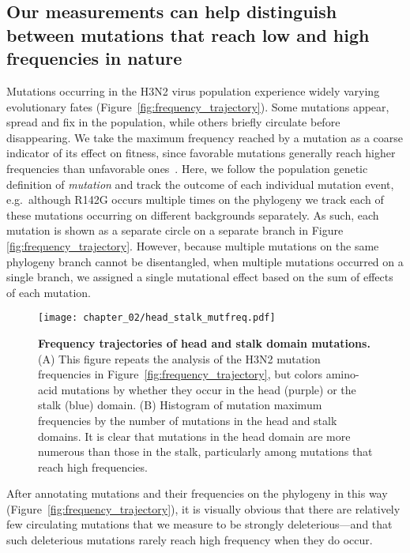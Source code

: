 \subsection{Our measurements can help distinguish between mutations that reach low and high frequencies in nature}
Mutations occurring in the H3N2 virus population experience widely varying evolutionary fates (Figure~\ref{fig:frequency_trajectory}).
Some mutations appear, spread and fix in the population, while others briefly circulate before disappearing.
We take the maximum frequency reached by a mutation as a coarse indicator of its effect on fitness, since favorable mutations generally reach higher frequencies than unfavorable ones~\citep{ewens2012mathematical}.
Here, we follow the population genetic definition of \textit{mutation} and track the outcome of each individual mutation event, e.g.\ although R142G occurs multiple times on the phylogeny we track each of these mutations occurring on different backgrounds separately.
As such, each mutation is shown as a separate circle on a separate branch in Figure \ref{fig:frequency_trajectory}.
However, because multiple mutations on the same phylogeny branch cannot be disentangled, when multiple mutations occurred on a single branch, we assigned a single mutational effect based on the sum of effects of each mutation.

\begin{figure}
\centerline{\texttt{[image: chapter\_02/head\_stalk\_mutfreq.pdf]}}
\caption[{Frequency trajectories of head and stalk domain mutations.}]{\label{suppfig:head_stalk_mutfreq_supp}
{\bf Frequency trajectories of head and stalk domain mutations.}
(A) This figure repeats the analysis of the H3N2 mutation frequencies in Figure~\ref{fig:frequency_trajectory}, but colors amino-acid mutations by whether they occur in the head (purple) or the stalk (blue) domain.
(B) Histogram of mutation maximum frequencies by the number of mutations in the head and stalk domains.
It is clear that mutations in the head domain are more numerous than those in the stalk, particularly among mutations that reach high frequencies.
}
\end{figure}

After annotating mutations and their frequencies on the phylogeny in this way (Figure~\ref{fig:frequency_trajectory}), it is visually obvious that there are relatively few circulating mutations that we measure to be strongly deleterious---and that such deleterious mutations rarely reach high frequency when they do occur.

